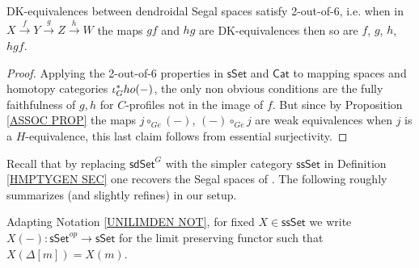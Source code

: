 \documentclass[a4paper,10pt
,draft
]{article}%
\begin{document}


\begin{corollary}\label{26COR}
DK-equivalences between dendroidal Segal spaces satisfy 2-out-of-6, i.e. when in
$X \xrightarrow{f} 
Y \xrightarrow{g}
Z \xrightarrow{h} W$ the maps
$gf$ and $hg$ are DK-equivalences then so are
$f$, $g$, $h$, $hgf$.
\end{corollary}

\begin{proof}
Applying the 2-out-of-6 properties in $\mathsf{sSet}$ and $\mathsf{Cat}$ to mapping spaces and homotopy categories $\iota_G^{\**}ho(-)$,
the only non obvious conditions are the fully faithfulness of $g,h$ for $C$-profiles not in the image of $f$. 
But since by Proposition \ref{ASSOC PROP} the maps
$j \circ_{Ge} (-)$, $(-)\circ_{Ge} j$
are weak equivalences when $j$ is a $H$-equivalence,
this last claim follows from essential surjectivity.
\end{proof}

Recall that by replacing $\mathsf{sdSet}^G$
with the simpler category $\mathsf{ssSet}$ in Definition \ref{HMPTYGEN SEC}
one recovers the Segal spaces of \cite{Rez01}.
The following roughly summarizes (and slightly refines)
\cite[Lemma 5.8, Theorem 6.2, Prop. 11.1, Lemma 11.10]{Rez01} in our setup.

Adapting Notation \ref{UNILIMDEN NOT}, for fixed $X \in \mathsf{ssSet}$ we write $X(-)\colon \mathsf{sSet}^{op} \to \mathsf{sSet}$ for the limit preserving functor such that
$X(\Delta[m]) = X(m)$. 
\end{document}
